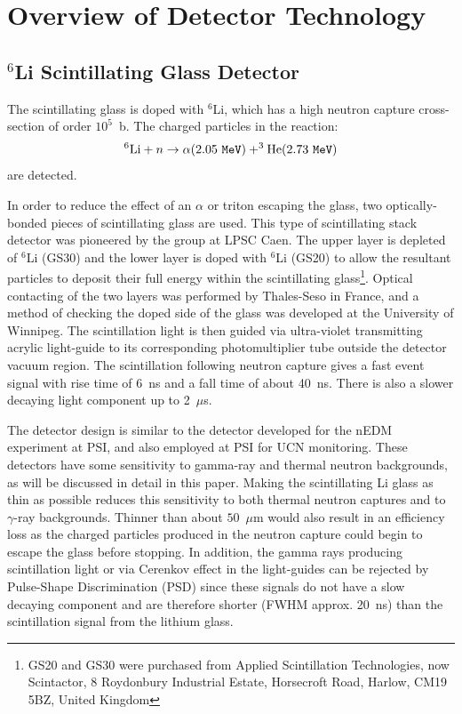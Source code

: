 \documentclass[letter,twocolumn,preprint,3p]{elsarticle}
\begin{document}
\section{Overview of Detector Technology}\label{sec:overview}


\subsection{$^6$Li Scintillating Glass Detector}

The scintillating glass is doped with $^6$Li, which has a high neutron
capture cross-section of order $10^5$~b.  The charged particles in the
reaction:
\begin{equation}
^6{\rm Li} + n \rightarrow \alpha (2.05\ {\tt MeV}) + ^{3}{\rm He} (2.73\ {\tt MeV})
\end{equation}
are detected. 

In order to reduce the effect of an $\alpha$ or triton escaping the
glass, two optically-bonded pieces of scintillating glass are used.
This type of scintillating stack detector was pioneered by the group
at LPSC Caen\cite{ban, ban05, afach}. The upper layer is depleted of
$^6$Li (GS30) and the lower layer is doped with $^6$Li (GS20) to allow
the resultant particles to deposit their full energy within the
scintillating glass\footnote{GS20 and GS30 were purchased from Applied
  Scintillation Technologies, now Scintactor, 8 Roydonbury Industrial
  Estate, Horsecroft Road, Harlow, CM19 5BZ, United Kingdom}.  Optical
contacting of the two layers was performed by Thales-Seso in France,
and a method of checking the doped side of the glass was developed at
the University of Winnipeg\cite{jamieson}.  The scintillation light is
then guided via ultra-violet transmitting acrylic light-guide to its
corresponding photomultiplier tube outside the detector vacuum region.
The scintillation following neutron capture gives a fast event signal
with rise time of 6~ns and a fall time of about 40~ns.  There is also
a slower decaying light component up to 2~$\mu$s.

The detector design is similar to the detector developed for the nEDM
experiment at PSI, and also employed at PSI for UCN
monitoring\cite{LGoeltl}.  These detectors have some sensitivity to
gamma-ray and thermal neutron backgrounds, as will be discussed in
detail in this paper.  Making the scintillating Li glass as thin as
possible reduces this sensitivity to both thermal neutron captures and
to $\gamma$-ray backgrounds.  Thinner than about $50$~$\mu$m would
also result in an efficiency loss as the charged particles produced in
the neutron capture could begin to escape the glass before stopping.
In addition, the gamma rays producing scintillation light or via
Cerenkov effect in the light-guides can be rejected by Pulse-Shape
Discrimination (PSD) since these signals do not have a slow decaying
component and are therefore shorter (FWHM approx. 20~ns) than the
scintillation signal from the lithium glass.
\end{document}
